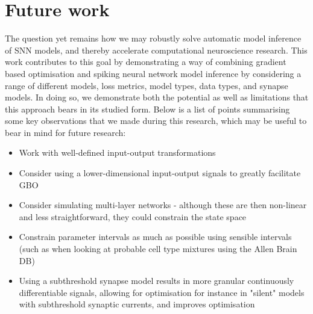 \documentclass[mphil,deptreport,ianc]{infthesis} %
\begin{document}


\section*{Future work}

The question yet remains how we may robustly solve automatic model inference of SNN models, and thereby accelerate computational neuroscience research.
This work contributes to this goal by demonstrating a way of combining gradient based optimisation and spiking neural network model inference by considering a range of different models, loss metrics, model types, data types, and synapse models.
In doing so, we demonstrate both the potential as well as limitations that this approach bears in its studied form.
Below is a list of points summarising some key observations that we made during this research, which may be useful to bear in mind for future research:

\begin{itemize}
    \item Work with well-defined input-output transformations
    \item Consider using a lower-dimensional input-output signals to greatly facilitate GBO
    \item Consider simulating multi-layer networks - although these are then non-linear and less straightforward, they could constrain the state space
    \item Constrain parameter intervals as much as possible using sensible intervals (such as when looking at probable cell type mixtures using the Allen Brain DB)
    \item Using a subthreshold synapse model results in more granular continuously differentiable signals, allowing for optimisation for instance in "silent" models with subthreshold synaptic currents, and improves optimisation
\end{itemize}








\appendix
\label{appendix:code}
\end{document}
